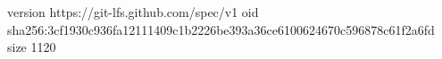 version https://git-lfs.github.com/spec/v1
oid sha256:3cf1930c936fa12111409c1b2226be393a36ce6100624670c596878c61f2a6fd
size 1120

